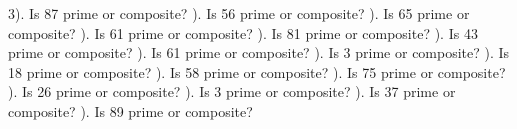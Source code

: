 \documentclass{article}%
\begin{document}
3). Is 87 prime or composite?%
\newline%
\newline%
). Is 56 prime or composite?%
\newline%
\newline%
). Is 65 prime or composite?%
\newline%
\newline%
). Is 61 prime or composite?%
\newline%
\newline%
). Is 81 prime or composite?%
\newline%
\newline%
). Is 43 prime or composite?%
\newline%
\newline%
). Is 61 prime or composite?%
\newline%
\newline%
). Is 3 prime or composite?%
\newline%
\newline%
). Is 18 prime or composite?%
\newline%
\newline%
). Is 58 prime or composite?%
\newline%
\newline%
). Is 75 prime or composite?%
\newline%
\newline%
). Is 26 prime or composite?%
\newline%
\newline%
). Is 3 prime or composite?%
\newline%
\newline%
). Is 37 prime or composite?%
\newline%
\newline%
). Is 89 prime or composite?%
\newline%
\end{document}

